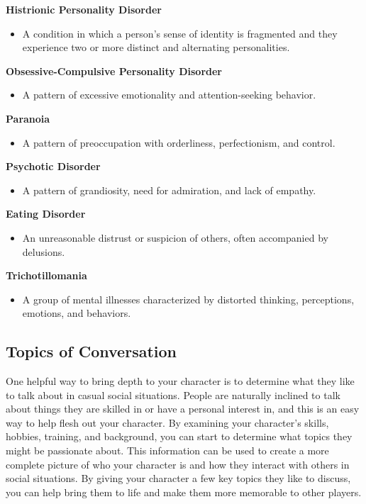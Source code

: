 \textbf{Histrionic Personality Disorder}

\begin{itemize}
\tightlist
\item
  A condition in which a person's sense of identity is fragmented and
  they experience two or more distinct and alternating personalities.
\end{itemize}

\textbf{Obsessive-Compulsive Personality Disorder}

\begin{itemize}
\tightlist
\item
  A pattern of excessive emotionality and attention-seeking behavior.
\end{itemize}

\textbf{Paranoia}

\begin{itemize}
\tightlist
\item
  A pattern of preoccupation with orderliness, perfectionism, and
  control.
\end{itemize}

\textbf{Psychotic Disorder}

\begin{itemize}
\tightlist
\item
  A pattern of grandiosity, need for admiration, and lack of empathy.
\end{itemize}

\textbf{Eating Disorder}

\begin{itemize}
\tightlist
\item
  An unreasonable distrust or suspicion of others, often accompanied by
  delusions.
\end{itemize}

\textbf{Trichotillomania}

\begin{itemize}
\tightlist
\item
  A group of mental illnesses characterized by distorted thinking,
  perceptions, emotions, and behaviors.
\end{itemize}

\hypertarget{topics-of-conversation}{%
\subsection{Topics of Conversation}\label{topics-of-conversation}}

One helpful way to bring depth to your character is to determine what
they like to talk about in casual social situations. People are
naturally inclined to talk about things they are skilled in or have a
personal interest in, and this is an easy way to help flesh out your
character. By examining your character's skills, hobbies, training, and
background, you can start to determine what topics they might be
passionate about. This information can be used to create a more complete
picture of who your character is and how they interact with others in
social situations. By giving your character a few key topics they like
to discuss, you can help bring them to life and make them more memorable
to other players.

